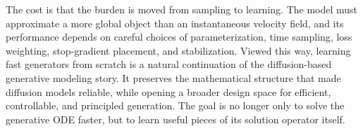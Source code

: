 The cost is that the burden is moved from sampling to learning.  The model must
approximate a more global object than an instantaneous velocity field, and its
performance depends on careful choices of parameterization, time sampling, loss
weighting, stop-gradient placement, and stabilization.  
Viewed this way, learning fast generators from scratch is a natural continuation
of the diffusion-based generative modeling story.  It preserves the mathematical
structure that made diffusion models reliable, while opening a broader design
space for efficient, controllable, and principled generation.  The goal is no
longer only to solve the generative ODE faster, but to learn useful pieces of
its solution operator itself.








